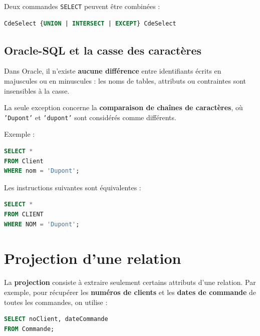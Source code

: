 Deux commandes \texttt{SELECT} peuvent être combinées :

\begin{sqlcodebox}
\begin{lstlisting}[language=SQL]
CdeSelect {UNION | INTERSECT | EXCEPT} CdeSelect
\end{lstlisting}
\end{sqlcodebox}

\subsection{Oracle-SQL et la casse des caractères}

Dans Oracle, il n’existe \textbf{aucune différence} entre identifiants écrits en majuscules ou en minuscules : les noms de tables, attributs ou contraintes sont insensibles à la casse.

La seule exception concerne la \textbf{comparaison de chaînes de caractères}, où \texttt{'Dupont'} et \texttt{'dupont'} sont considérés comme différents.

Exemple :

\begin{sqlcodebox}
\begin{lstlisting}[language=SQL]
SELECT *
FROM Client
WHERE nom = 'Dupont';
\end{lstlisting}
\end{sqlcodebox}

Les instructions suivantes sont équivalentes :

\begin{sqlcodebox}
\begin{lstlisting}[language=SQL]
SELECT *
FROM CLIENT
WHERE NOM = 'Dupont';
\end{lstlisting}
\end{sqlcodebox}







\section{Projection d'une relation}

La \textbf{projection} consiste à extraire seulement certains attributs d’une relation.  
Par exemple, pour récupérer les \textbf{numéros de clients} et les \textbf{dates de commande} de toutes les commandes, on utilise :

\begin{sqlcodebox}
\begin{lstlisting}[language=SQL]
SELECT noClient, dateCommande
FROM Commande;
\end{lstlisting}
\end{sqlcodebox}

